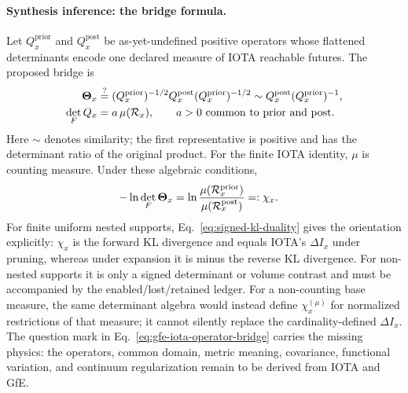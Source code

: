 \paragraph{Synthesis inference: the bridge formula.}
Let $Q_x^{\mathrm{prior}}$ and $Q_x^{\mathrm{post}}$ be as-yet-undefined positive
operators whose flattened determinants encode one declared measure of IOTA
reachable futures. The proposed bridge is
\begin{equation}
 \begin{aligned}
 \boldsymbol\Theta_x
 &\stackrel{?}{=}(Q_x^{\mathrm{prior}})^{-1/2}
 Q_x^{\mathrm{post}}(Q_x^{\mathrm{prior}})^{-1/2}
 \sim Q_x^{\mathrm{post}}(Q_x^{\mathrm{prior}})^{-1},\\
 \det_F Q_x&=a\,\mu(\mathcal{R}_x),
 \qquad a>0\ \text{common to prior and post}.
 \end{aligned}
 \label{eq:gfe-iota-operator-bridge}
\end{equation}
Here $\sim$ denotes similarity; the first representative is positive and has
the determinant ratio of the original product. For the finite IOTA identity,
$\mu$ is counting measure. Under these algebraic conditions,
\begin{equation}
 \begin{aligned}
 -\ln\det_F\boldsymbol\Theta_x
 &=\ln\frac{\mu(\mathcal{R}_x^{\mathrm{prior}})}
             {\mu(\mathcal{R}_x^{\mathrm{post}})}
 =:\chi_x.
 \end{aligned}
 \label{eq:gfe-iota-scalar-bridge}
\end{equation}
For finite uniform nested supports, Eq.~\eqref{eq:signed-kl-duality} gives the
orientation explicitly: $\chi_x$ is the forward KL divergence and equals
IOTA's $\Delta I_x$ under pruning, whereas under expansion it is minus the
reverse KL divergence. For non-nested supports it is only a signed determinant
or volume contrast and must be accompanied by the enabled/lost/retained ledger.
For a non-counting base measure, the same determinant algebra would instead
define $\chi_x^{(\mu)}$ for normalized restrictions of that measure; it cannot
silently replace the cardinality-defined $\Delta I_x$. The question mark
in Eq.~\eqref{eq:gfe-iota-operator-bridge} carries the missing physics:
the operators, common domain, metric meaning, covariance, functional variation,
and continuum regularization remain to be derived from IOTA and GfE.

